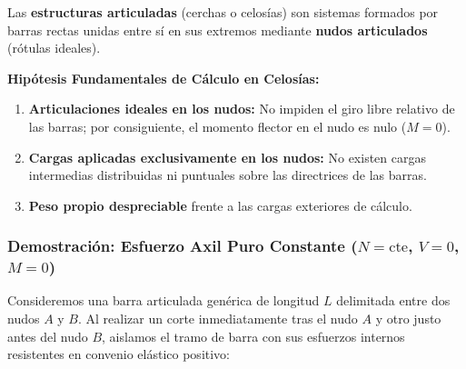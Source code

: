 Las \textbf{estructuras articuladas} (cerchas o celosías) son sistemas formados por barras rectas unidas entre sí en sus extremos mediante \textbf{nudos articulados} (rótulas ideales).

\begin{tcolorbox}[colback=white, colframe=myb!80!black, arc=4pt, boxrule=0.9pt]
    \textbf{Hipótesis Fundamentales de Cálculo en Celosías:}
    \begin{enumerate}
        \item \textbf{Articulaciones ideales en los nudos:} No impiden el giro libre relativo de las barras; por consiguiente, el momento flector en el nudo es nulo ($M = 0$).
        \item \textbf{Cargas aplicadas exclusivamente en los nudos:} No existen cargas intermedias distribuidas ni puntuales sobre las directrices de las barras.
        \item \textbf{Peso propio despreciable} frente a las cargas exteriores de cálculo.
    \end{enumerate}
\end{tcolorbox}

\subsubsection{Demostración: Esfuerzo Axil Puro Constante ($N = \text{cte}$, $V = 0$, $M = 0$)}

Consideremos una barra articulada genérica de longitud $L$ delimitada entre dos nudos $A$ y $B$. Al realizar un corte inmediatamente tras el nudo $A$ y otro justo antes del nudo $B$, aislamos el tramo de barra con sus esfuerzos internos resistentes en convenio elástico positivo:


